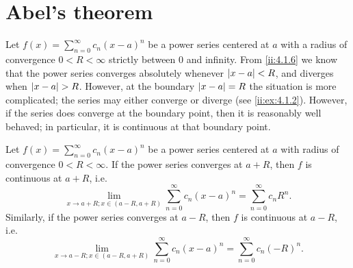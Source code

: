 \section{Abel's theorem}\label{ii:sec:4.3}

\begin{note}
  Let \(f(x) = \sum_{n = 0}^\infty c_n (x - a)^n\) be a power series centered at \(a\) with a radius of convergence \(0 < R < \infty\) strictly between \(0\) and infinity.
  From \cref{ii:4.1.6} we know that the power series converges absolutely whenever \(\left\lvert x - a\right\rvert < R\), and diverges when \(\left\lvert x - a\right\rvert > R\).
  However, at the boundary \(\left\lvert x - a\right\rvert = R\) the situation is more complicated;
  the series may either converge or diverge (see \cref{ii:ex:4.1.2}).
  However, if the series does converge at the boundary point, then it is reasonably well behaved;
  in particular, it is continuous at that boundary point.
\end{note}

\begin{thm}\label{ii:4.3.1}
  Let \(f(x) = \sum_{n = 0}^\infty c_n (x - a)^n\) be a power series centered at \(a\) with radius of convergence \(0 < R < \infty\).
  If the power series converges at \(a + R\), then \(f\) is continuous at \(a + R\), i.e.
  \[
    \lim_{x \to a + R ; x \in (a - R, a + R)} \sum_{n = 0}^\infty c_n (x - a)^n = \sum_{n = 0}^\infty c_n R^n.
  \]
  Similarly, if the power series converges at \(a - R\), then \(f\) is continuous at \(a - R\), i.e.
  \[
    \lim_{x \to a - R ; x \in (a - R, a + R)} \sum_{n = 0}^\infty c_n (x - a)^n = \sum_{n = 0}^\infty c_n (-R)^n.
  \]
\end{thm}

